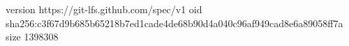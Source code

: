 version https://git-lfs.github.com/spec/v1
oid sha256:c3f67d9b685b65218b7ed1cade4de68b90d4a040c96af949cad8e6a89058ff7a
size 1398308
